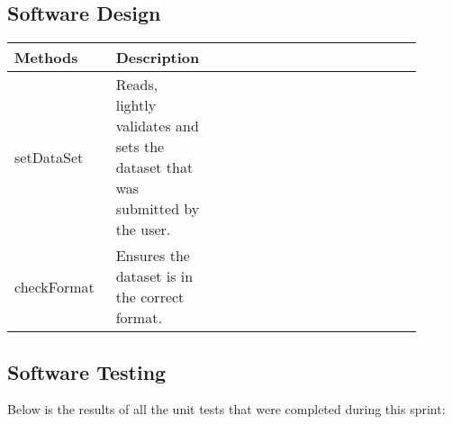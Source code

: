 \documentclass{scrreprt}
\begin{document}
% 
\subsection{Software Design}

\begin{table}[h!]
\begin{tabular}{|p{0.25\linewidth}
                |p{0.1\linewidth}
                |p{0.45\linewidth}
                |p{0.1\linewidth}|}
    \hline
    Methods & Description \\
    \hline
    setDataSet     &   Reads, lightly validates and sets the dataset that was submitted by the user. \\
    \hline
    checkFormat     &    Ensures the dataset is in the correct format. \\
    \hline
\end{tabular}
\end{table}

% 
\subsection{Software Testing}

Below is the results of all the unit tests that were completed during this sprint:
\end{document}
